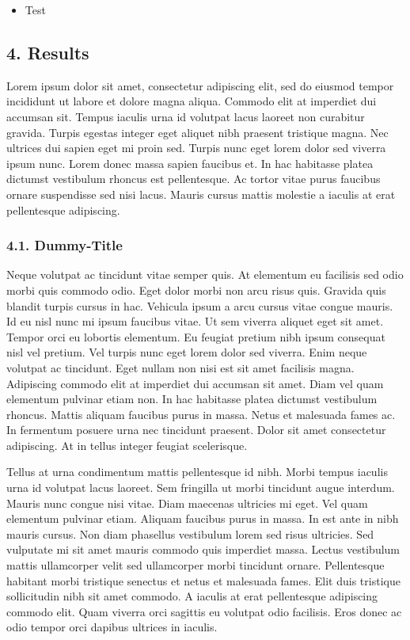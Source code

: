 \documentclass[
]{article}
\providecommand{\tightlist}{%
  \setlength{\itemsep}{0pt}\setlength{\parskip}{0pt}}
\begin{document}
\begin{itemize}
\tightlist
\item
  Test
\end{itemize}

\newpage

\hypertarget{results}{%
\subsection{4. Results}\label{results}}

Lorem ipsum dolor sit amet, consectetur adipiscing elit, sed do eiusmod
tempor incididunt ut labore et dolore magna aliqua. Commodo elit at
imperdiet dui accumsan sit. Tempus iaculis urna id volutpat lacus
laoreet non curabitur gravida. Turpis egestas integer eget aliquet nibh
praesent tristique magna. Nec ultrices dui sapien eget mi proin sed.
Turpis nunc eget lorem dolor sed viverra ipsum nunc. Lorem donec massa
sapien faucibus et. In hac habitasse platea dictumst vestibulum rhoncus
est pellentesque. Ac tortor vitae purus faucibus ornare suspendisse sed
nisi lacus. Mauris cursus mattis molestie a iaculis at erat pellentesque
adipiscing.

\hypertarget{dummy-title-3}{%
\subsubsection{4.1. Dummy-Title}\label{dummy-title-3}}

Neque volutpat ac tincidunt vitae semper quis. At elementum eu facilisis
sed odio morbi quis commodo odio. Eget dolor morbi non arcu risus quis.
Gravida quis blandit turpis cursus in hac. Vehicula ipsum a arcu cursus
vitae congue mauris. Id eu nisl nunc mi ipsum faucibus vitae. Ut sem
viverra aliquet eget sit amet. Tempor orci eu lobortis elementum. Eu
feugiat pretium nibh ipsum consequat nisl vel pretium. Vel turpis nunc
eget lorem dolor sed viverra. Enim neque volutpat ac tincidunt. Eget
nullam non nisi est sit amet facilisis magna. Adipiscing commodo elit at
imperdiet dui accumsan sit amet. Diam vel quam elementum pulvinar etiam
non. In hac habitasse platea dictumst vestibulum rhoncus. Mattis aliquam
faucibus purus in massa. Netus et malesuada fames ac. In fermentum
posuere urna nec tincidunt praesent. Dolor sit amet consectetur
adipiscing. At in tellus integer feugiat scelerisque.

Tellus at urna condimentum mattis pellentesque id nibh. Morbi tempus
iaculis urna id volutpat lacus laoreet. Sem fringilla ut morbi tincidunt
augue interdum. Mauris nunc congue nisi vitae. Diam maecenas ultricies
mi eget. Vel quam elementum pulvinar etiam. Aliquam faucibus purus in
massa. In est ante in nibh mauris cursus. Non diam phasellus vestibulum
lorem sed risus ultricies. Sed vulputate mi sit amet mauris commodo quis
imperdiet massa. Lectus vestibulum mattis ullamcorper velit sed
ullamcorper morbi tincidunt ornare. Pellentesque habitant morbi
tristique senectus et netus et malesuada fames. Elit duis tristique
sollicitudin nibh sit amet commodo. A iaculis at erat pellentesque
adipiscing commodo elit. Quam viverra orci sagittis eu volutpat odio
facilisis. Eros donec ac odio tempor orci dapibus ultrices in iaculis.
\end{document}
